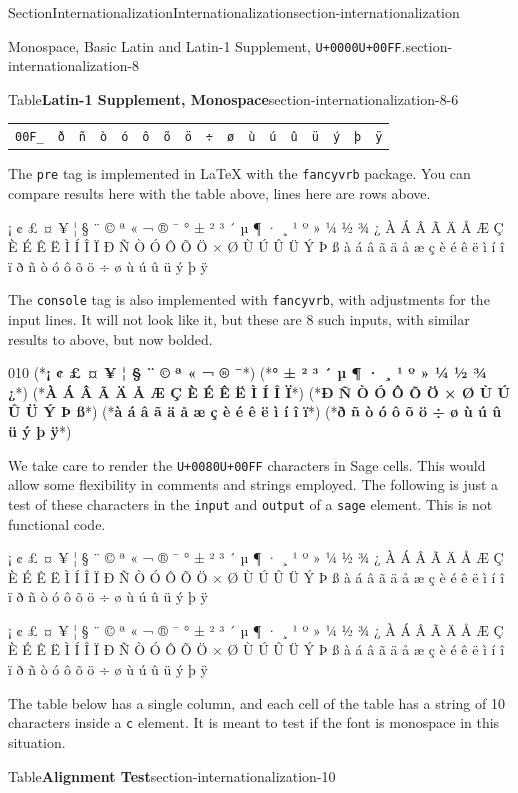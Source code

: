\documentclass[twoside,10pt,]{article}
\newcommand{\mono}[1]{\texttt{#1}}
\numberwithin{equation}{section}
\newcommand{\consoleinput}[1]{\textbf{#1}}
\begin{document}
\begin{sectionptx}{Section}{Internationalization}{}{Internationalization}{}{}{section-internationalization}
\begin{paragraphs}{Monospace, Basic Latin and Latin-1 Supplement, \mono{U+0000}\textendash{}\mono{U+00FF}.}{section-internationalization-8}
\begin{tableptx}{Table}{\textbf{Latin-1 Supplement, Monospace}}{section-internationalization-8-6}{}
{\begin{tabular}{lllllllllllllllll}
\mono{00F\_}&\mono{ð}&\mono{ñ}&\mono{ò}&\mono{ó}&\mono{ô}&\mono{õ}&\mono{ö}&\mono{÷}&\mono{ø}&\mono{ù}&\mono{ú}&\mono{û}&\mono{ü}&\mono{ý}&\mono{þ}&\mono{ÿ}
\end{tabular}
}%
\end{tableptx}%
The \mono{pre} tag is implemented in \LaTeX{} with the \mono{fancyvrb} package.  You can compare results here with the table above, lines here are rows above.%
\begin{preformatted}
  ¡ ¢ £ ¤ ¥ ¦ § ¨ © ª « ¬   ® ¯
° ± ² ³ ´ µ ¶ · ¸ ¹ º » ¼ ½ ¾ ¿
À Á Â Ã Ä Å Æ Ç È É Ê Ë Ì Í Î Ï
Ð Ñ Ò Ó Ô Õ Ö × Ø Ù Ú Û Ü Ý Þ ß
à á â ã ä å æ ç è é ê ë ì í î ï
ð ñ ò ó ô õ ö ÷ ø ù ú û ü ý þ ÿ
\end{preformatted}
The \mono{console} tag is also implemented with \mono{fancyvrb}, with adjustments for the input lines.  It will not look like it, but these are 8 such inputs, with similar results to above, but now bolded.%
\begin{console}{0}{1}{0}
(*\consoleinput{¡ ¢ £ ¤ ¥ ¦ § ¨ © ª « ¬   ® ¯}*)
(*\consoleinput{° ± ² ³ ´ µ ¶ · ¸ ¹ º » ¼ ½ ¾ ¿}*)
(*\consoleinput{À Á Â Ã Ä Å Æ Ç È É Ê Ë Ì Í Î Ï}*)
(*\consoleinput{Ð Ñ Ò Ó Ô Õ Ö × Ø Ù Ú Û Ü Ý Þ ß}*)
(*\consoleinput{à á â ã ä å æ ç è é ê ë ì í î ï}*)
(*\consoleinput{ð ñ ò ó ô õ ö ÷ ø ù ú û ü ý þ ÿ}*)
\end{console}
We take care to render the \mono{U+0080}\textendash{}\mono{U+00FF} characters in Sage cells.  This would allow some flexibility in comments and strings employed.  The following is just a test of these characters in the \mono{input} and \mono{output} of a \mono{sage} element.  This is not functional code.%
\begin{sageinput}
  ¡ ¢ £ ¤ ¥ ¦ § ¨ © ª « ¬   ® ¯
° ± ² ³ ´ µ ¶ · ¸ ¹ º » ¼ ½ ¾ ¿
À Á Â Ã Ä Å Æ Ç È É Ê Ë Ì Í Î Ï
Ð Ñ Ò Ó Ô Õ Ö × Ø Ù Ú Û Ü Ý Þ ß
à á â ã ä å æ ç è é ê ë ì í î ï
ð ñ ò ó ô õ ö ÷ ø ù ú û ü ý þ ÿ
\end{sageinput}
\begin{sageoutput}
  ¡ ¢ £ ¤ ¥ ¦ § ¨ © ª « ¬   ® ¯
° ± ² ³ ´ µ ¶ · ¸ ¹ º » ¼ ½ ¾ ¿
À Á Â Ã Ä Å Æ Ç È É Ê Ë Ì Í Î Ï
Ð Ñ Ò Ó Ô Õ Ö × Ø Ù Ú Û Ü Ý Þ ß
à á â ã ä å æ ç è é ê ë ì í î ï
ð ñ ò ó ô õ ö ÷ ø ù ú û ü ý þ ÿ
\end{sageoutput}
\end{paragraphs}%
\par\medskip
The table below has a single column, and each cell of the table has a string of 10 characters inside a \mono{c} element.  It is meant to test if the font is monospace in this situation.%
\begin{tableptx}{Table}{\textbf{Alignment Test}}{section-internationalization-10}{}%

\end{tableptx}
\end{sectionptx}
\end{document}
